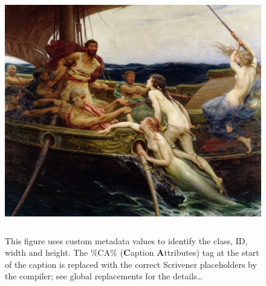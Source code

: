 \documentclass[
  12pt,
  a4paper,
  oneside,
  numbers=noenddot,
  titlepage,
  toclink=all,
  toc=bibliography]{scrbook}
\theoremstyle{definition}
\theoremstyle{definition}
\theoremstyle{definition}
\theoremstyle{plain}
\theoremstyle{plain}
\theoremstyle{plain}
\theoremstyle{plain}
\theoremstyle{plain}
\theoremstyle{remark}
\begin{document}
\begin{figure}

{\centering \includegraphics[width=5.0625in,height=4.1875in]{Ulysses1.jpg}

}

\caption{\label{fig-scriv22}This figure uses custom metadata values to
identify the class, ID, width and height. The \%CA\%\hspace{0pt}
(\textbf{C}aption \textbf{A}ttributes) tag at the start of the caption
is replaced with the correct Scrivener placeholders by the compiler; see
global replacements for the details\ldots{}}

\end{figure}
\end{document}
